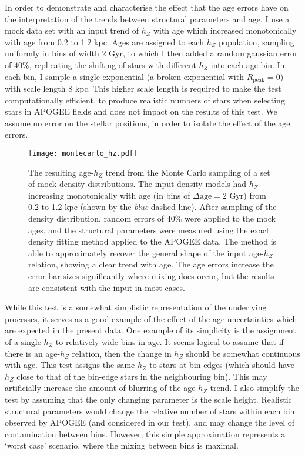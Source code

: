 In order to demonstrate and characterise the effect that the age errors have on the interpretation of the trends between structural parameters and age, I use a mock data set with an input trend of $h_Z$ with age which increased monotonically with age from 0.2 to 1.2 kpc. Ages are assigned to each $h_Z$ population, sampling uniformly in bins of width 2 Gyr, to which I then added a random gaussian error of $40\%$, replicating the shifting of stars with different $h_Z$ into each age bin. In each bin, I sample a single exponential (a broken exponential with $R_\mathrm{peak}=0$) with scale length 8 kpc. This higher scale length is required to make the test computationally efficient, to produce realistic numbers of stars when selecting stars in APOGEE fields and does not impact on the results of this test. We assume no error on the stellar positions, in order to isolate the effect of the age errors. 

 \begin{figure}
      \texttt{[image: montecarlo\_hz.pdf]}
   \caption[Scale height vs. age for a Monte Carlo mock data set, intended to simulate the effect of age uncertainties on the trends recovered by the density fitting methodology]{The resulting age-$h_Z$ trend from the Monte Carlo sampling of a set of mock density distributions. The input  density models had $h_Z$ increasing monotonically with age (in bins of $\Delta\mathrm{age}= 2$ Gyr) from 0.2 to 1.2 kpc (shown by the \emph{blue} dashed line). After sampling of the density distribution, random errors of $40\%$ were applied to the mock ages, and the structural parameters were measured using the exact density fitting method applied to the APOGEE data. The method is able to approximately recover the general shape of the input age-$h_Z$ relation, showing a clear trend with age. The age errors increase the error bar sizes significantly where mixing does occur, but the results are consistent with the input in most cases.}
     \label{fig:montecarlo_hz}
 \end{figure}

While this test is a somewhat simplistic representation of the underlying processes, it serves as a good example of the effect of the age uncertainties which are expected in the present data. One example of its simplicity is the assignment of a single $h_Z$ to relatively wide bins in age. It seems logical to assume that if there is an age-$h_Z$ relation, then the change in $h_Z$ should be somewhat continuous with age. This test assigns the same $h_Z$ to stars at bin edges (which should have $h_Z$ close to that of the bin-edge stars in the neighbouring bin). This may artificially increase the amount of blurring of the age-$h_Z$ trend. I also simplify the test by assuming that the only changing parameter is the scale height. Realistic structural parameters would change the relative number of stars within each bin observed by APOGEE (and considered in our test), and may change the level of contamination between bins. However, this simple approximation represents a `worst case' scenario, where the mixing between bins is maximal.

